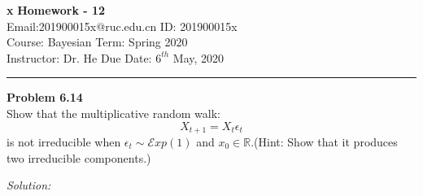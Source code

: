 \documentclass[a4paper, 11pt]{article}
\newenvironment{problem}[2][Problem]
    { \begin{mdframed}[backgroundcolor=gray!20] \textbf{#1 #2} \\}
    {  \end{mdframed}}
\newenvironment{solution}
    {\textit{Solution:}}
    {}
\begin{document}
\noindent
\large\textbf{x} \hfill \textbf{Homework - 12}   \\
Email:201900015x@ruc.edu.cn  \hfill ID: 201900015x \\
\normalsize Course: Bayesian \hfill Term: Spring 2020\\
Instructor: Dr. He \hfill Due Date: $6^{th}$ May, 2020 \\
\noindent\rule{7in}{2.8pt}

\begin{problem}{6.14}
Show that the multiplicative random walk:
$$X_{t+1}=X_t\epsilon_t$$
is not irreducible when $\epsilon_{t} \sim \mathcal{E} x p(1)$ and $x_{0} \in \mathbb{R}$.(Hint: Show that it produces
two irreducible components.) 
\end{problem}
\begin{solution}
    
\end{solution}
\end{document}
